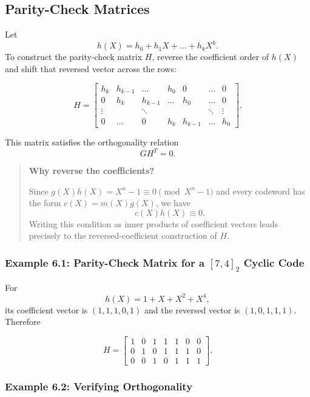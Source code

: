 \documentclass[
]{article}
\begin{document}
\subsection{Parity-Check Matrices}\label{how-do-we-construct-a-parity-check-matrix}

Let \[h(X)=h_0+h_1X+\dots+h_kX^k.\] To construct the parity-check matrix
\(H\), reverse the coefficient order of \(h(X)\) and shift that reversed
vector across the rows:

\[H = \begin{bmatrix}
h_k & h_{k-1} & \dots & h_0 & 0 & \dots & 0 \\
0 & h_k & h_{k-1} & \dots & h_0 & \dots & 0 \\
\vdots & & \ddots & & & \ddots & \vdots \\
0 & \dots & 0 & h_k & h_{k-1} & \dots & h_0
\end{bmatrix}.\]

This matrix satisfies the orthogonality relation \[GH^T=0.\]

\begin{quote}
\textbf{Why reverse the coefficients?}

Since \(g(X)h(X)=X^n-1 \equiv 0 \pmod{X^n-1}\) and every codeword has
the form \(c(X)=m(X)g(X)\), we have \[c(X)h(X) \equiv 0.\] Writing this
condition as inner products of coefficient vectors leads precisely to
the reversed-coefficient construction of \(H\).
\end{quote}

\subsubsection{\texorpdfstring{Example 6.1: Parity-Check Matrix for a
\([7,4]_2\) Cyclic
Code}{Example 6.1: Parity-Check Matrix for a {[}7,4{]}\_2 Cyclic Code}}\label{example-6.1-parity-check-matrix-for-a-74_2-cyclic-code}

For \[h(X)=1+X+X^2+X^4,\] its coefficient vector is \((1,1,1,0,1)\) and
the reversed vector is \((1,0,1,1,1)\). Therefore

\[H = \begin{bmatrix}
1 & 0 & 1 & 1 & 1 & 0 & 0 \\
0 & 1 & 0 & 1 & 1 & 1 & 0 \\
0 & 0 & 1 & 0 & 1 & 1 & 1
\end{bmatrix}.\]

\subsubsection{Example 6.2: Verifying
Orthogonality}\label{example-6.2-verifying-orthogonality}
\end{document}
